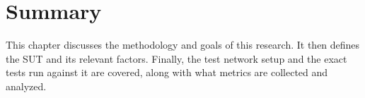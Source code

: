 \section{Summary}
\label{sec:method_summary}
\par This chapter discusses the methodology and goals of this research. It then defines the \ac{SUT} and its relevant factors. Finally, the test network setup and the exact tests run against it are covered, along with what metrics are collected and analyzed.

\begin{comment}
\tbd{don't need this section? Edit if we do}

\par This research determines if \ac{DYNAT}---the use of a gateway with a rapidly changing external \ac{IP} address---can effectively determine whether traffic should be allowed into a network. Several previous research efforts in this area already proved that \ac{DYNAT} made it more difficult to gain knowledge of a network \cite{BBNDYNAT} and that performance could be minimally impacted \cite{NAH}. 

\par A test network composed of two \ac{DYNAT}-protected networks and a few external hosts is used to explore this question. The custom \ac{DYNAT} solution used here, known as \ac{ARG}, allows the tuning of important system parameters. For the sake of this research, the primary factor is the hop rate. Levels used for experimentation include multiple times a second hops, several times a minute, and no hopping at all. Outside of \ac{ARG} itself, most hosts on the network run traffic generation scripts to simulate network activity. These scripts allow for the adjustment of packet rate, proportion of ``valid'' or ``invalid'' traffic produced, and how much traffic flows between the protected networks verses to the external hosts.

\par All hosts run the packet capture utilities, allowing custom analysis tools to run through each host's logs and pull out the desired metrics. For the research question posed above, the metrics include the overall rejection/acceptance rate of packets, incorrect classification of packets, and why packets are typically rejected. The factors and levels discussed in Section \ref{sec:factors} and the 10 replications result in 810 total experiments.
\end{comment}

